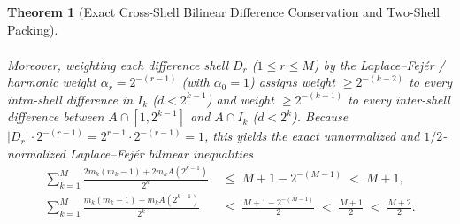 \documentclass[11pt,reqno]{amsart}
\newtheorem{theorem}{Theorem}[section]
\theoremstyle{definition}
\theoremstyle{remark}
\begin{document}
\begin{theorem}[Exact Cross-Shell Bilinear Difference Conservation and Two-Shell Packing]
\begin{enumerate}
\begin{equation}
\begin{aligned}
    \end{aligned}
  \end{equation}
  Moreover, weighting each difference shell $D_r$ ($1 \le r \le M$) by the Laplace--Fej\'er / harmonic weight $\alpha_r = 2^{-(r-1)}$ (with $\alpha_0 = 1$) assigns weight $\ge 2^{-(k-2)}$ to every intra-shell difference in $I_k$ ($d < 2^{k-1}$) and weight $\ge 2^{-(k-1)}$ to every inter-shell difference between $A \cap [1, 2^{k-1}]$ and $A \cap I_k$ ($d < 2^k$). Because $|D_r| \cdot 2^{-(r-1)} = 2^{r-1} \cdot 2^{-(r-1)} = 1$, this yields the exact unnormalized and $1/2$-normalized Laplace--Fej\'er bilinear inequalities
  \begin{equation}\label{eq:laplace_fejer_bilinear}
    \begin{aligned}
      \sum_{k=1}^M \frac{2 m_k(m_k - 1) + 2 m_k A(2^{k-1})}{2^k} &\;\le\; M + 1 - 2^{-(M-1)} \;<\; M + 1, \\
      \sum_{k=1}^M \frac{m_k(m_k - 1) + m_k A(2^{k-1})}{2^k} &\;\le\; \frac{M + 1 - 2^{-(M-1)}}{2} \;<\; \frac{M + 1}{2} \;<\; \frac{M + 2}{2}.
    \end{aligned}
  \end{equation}
\end{enumerate}
\end{theorem}
\end{document}
